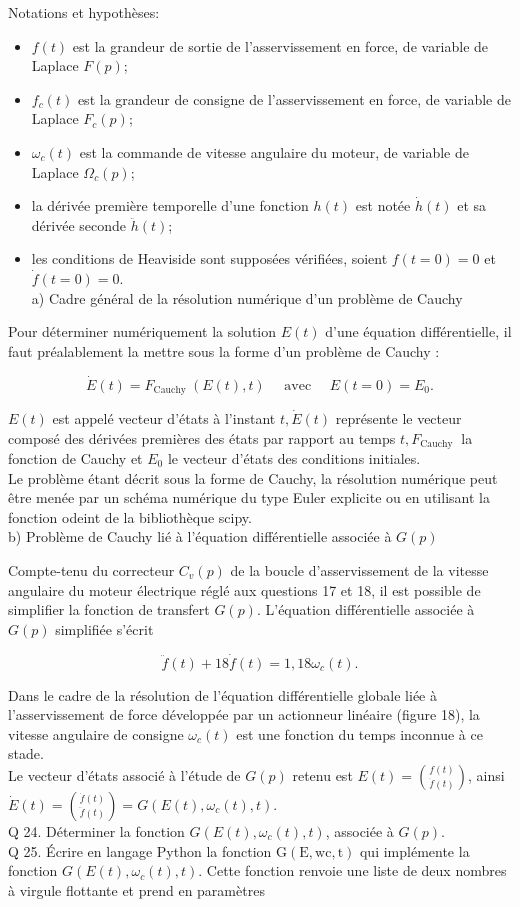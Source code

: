 Notations et hypothèses:

\begin{itemize}
  \item $f(t)$ est la grandeur de sortie de l'asservissement en force, de variable de Laplace $F(p)$;
  \item $f_{c}(t)$ est la grandeur de consigne de l'asservissement en force, de variable de Laplace $F_{c}(p)$;
  \item $\omega_{c}(t)$ est la commande de vitesse angulaire du moteur, de variable de Laplace $\Omega_{c}(p)$;
  \item la dérivée première temporelle d'une fonction $h(t)$ est notée $\dot{h}(t)$ et sa dérivée seconde $\ddot{h}(t)$;
  \item les conditions de Heaviside sont supposées vérifiées, soient $f(t=0)=0$ et $\dot{f}(t=0)=0$.\\
a) Cadre général de la résolution numérique d'un problème de Cauchy
\end{itemize}

Pour déterminer numériquement la solution $E(t)$ d'une équation différentielle, il faut préalablement la mettre sous la forme d'un problème de Cauchy :

$$
\dot{E}(t)=F_{\text {Cauchy }}(E(t), t) \quad \text { avec } \quad E(t=0)=E_{0} .
$$

$E(t)$ est appelé vecteur d'états à l'instant $t, \dot{E}(t)$ représente le vecteur composé des dérivées premières des états par rapport au temps $t, F_{\text {Cauchy }}$ la fonction de Cauchy et $E_{0}$ le vecteur d'états des conditions initiales.\\
Le problème étant décrit sous la forme de Cauchy, la résolution numérique peut être menée par un schéma numérique du type Euler explicite ou en utilisant la fonction odeint de la bibliothèque scipy.\\
b) Problème de Cauchy lié à l'équation différentielle associée à $G(p)$

Compte-tenu du correcteur $C_{v}(p)$ de la boucle d'asservissement de la vitesse angulaire du moteur électrique réglé aux questions 17 et 18, il est possible de simplifier la fonction de transfert $G(p)$. L'équation différentielle associée à $G(p)$ simplifiée s'écrit

$$
\ddot{f}(t)+18 \dot{f}(t)=1,18 \omega_{c}(t) .
$$

Dans le cadre de la résolution de l'équation différentielle globale liée à l'asservissement de force développée par un actionneur linéaire (figure 18), la vitesse angulaire de consigne $\omega_{c}(t)$ est une fonction du temps inconnue à ce stade.\\
Le vecteur d'états associé à l'étude de $G(p)$ retenu est $E(t)=\binom{f(t)}{\dot{f}(t)}$, ainsi $\dot{E}(t)=\binom{\dot{f}(t)}{\ddot{f}(t)}=G\left(E(t), \omega_{c}(t), t\right)$.\\
Q 24. Déterminer la fonction $G\left(E(t), \omega_{c}(t), t\right)$, associée à $G(p)$.\\
Q 25. Écrire en langage Python la fonction $\mathrm{G}(\mathrm{E}, \mathrm{wc}, \mathrm{t})$ qui implémente la fonction $G\left(E(t), \omega_{c}(t), t\right)$. Cette fonction renvoie une liste de deux nombres à virgule flottante et prend en paramètres

